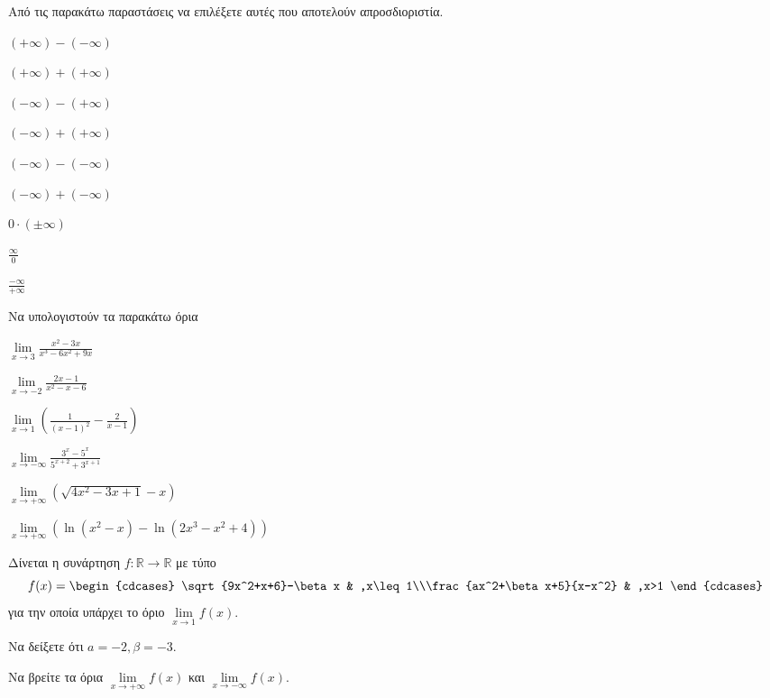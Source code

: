\documentclass[ektypwsh]{frontisthrio-diag}
\begin{document}
\begin{thema}
\begin{erwthma}
\item Από τις παρακάτω παραστάσεις να επιλέξετε αυτές που αποτελούν απροσδιοριστία.
\begin{alist}
\begin{multicols}{3}
\item $ (+\infty)-(-\infty) $
\item $ (+\infty)+(+\infty) $
\item $ (-\infty)-(+\infty) $
\item $ (-\infty)+(+\infty) $
\item $ (-\infty)-(-\infty) $
\item $ (-\infty)+(-\infty) $
\item $ 0\cdot(\pm\infty) $
\item $ \frac{\infty}{0} $
\item $ \frac{-\infty}{+\infty} $
\end{multicols}
\end{alist}
\end{erwthma}
\item Να υπολογιστούν τα παρακάτω όρια
\begin{multicols}{2}
\begin{erwthma}
\item $ \displaystyle\lim\limits_{x\to 3}\frac{x^2-3x}{x^3-6x^2+9x} $
\item $ \displaystyle\lim\limits_{x\to -2}{\frac{2x-1}{x^2-x-6}} $
\item $ \displaystyle\lim\limits_{x\to 1}{\left(\frac{1}{(x-1)^2}-\frac{2}{x-1}\right)} $
\item $ \lim\limits_{x\to -\infty}{\frac{3^x-5^x}{5^{x+2}+3^{x+1}}} $
\item $ \lim\limits_{x\to+\infty}{\left(\sqrt{4x^2-3x+1}-x\right)} $
\item $ \lim\limits_{x\to +\infty}{\left(\ln(x^2-x)-\ln(2x^3-x^2+4)\right)} $
\end{erwthma}
\end{multicols}
\item Δίνεται η συνάρτηση $ f:\mathbb{R}\to\mathbb{R} $ με τύπο
\[ f(x)=\begin{cdcases}
\sqrt{9x^2+x+6}-\beta x & ,x\leq 1\\\frac{ax^2+\beta x+5}{x-x^2} & ,x>1
\end{cdcases} \]
για την οποία υπάρχει το όριο $ \lim\limits_{x\to1}{f(x)} $.
\begin{erwthma}
\item Να δείξετε ότι $ a=-2,\beta=-3 $.
\item Να βρείτε τα όρια $ \lim\limits_{x\to +\infty}{f(x)} $ και $ \lim\limits_{x\to-\infty}{f(x)} $.

\end{erwthma}
\end{thema}
\end{document}
